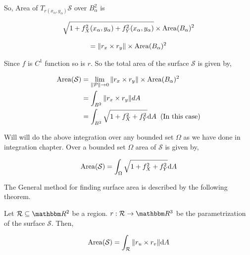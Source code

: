 \documentclass[../Analysis-3]{subfiles}
\begin{document}
So, Area of $T_{r(x_{\alpha},y_{\alpha})} \mathcal{S}$ over $B_{\alpha}^2$ is

$$\sqrt{1 + f_X^2(x_{\alpha},y_{\alpha}) + f_Y^2(x_{\alpha},y_{\alpha})} \times \operatorname{Area}(B_{\alpha})^2$$

$$ = \norm{r_x \times r_y} \times \operatorname{Area}(B_{\alpha})^2$$

\pagebreak

Since $f$ is $C^1$ function so is $r$. So the total area of the surface $\mathcal{S}$ is given by,

\begin{align*}
    \operatorname{Area} (\mathcal{S}) & = \lim_{\norm{\mathcal{P}} \to 0} \norm{r_x \times r_y} \times \operatorname{Area}(B_{\alpha})^2 \\
                        & = \int_{B^2} \norm{r_x \times r_y} dA                                              \\
                        & = \int_{B^2} \sqrt{1 + f_X^2 +f_Y^2} \dd A \hspace{0.2cm}(\text{In this case})
\end{align*}

Will will do the above integration over any bounded set $\Omega$ as we have done in  integration chapter. Over a bounded set $\Omega$ area of $\mathcal{S}$ is given by,

\begin{equation}
    \operatorname{Area} (\mathcal{S}) =  \int_{\Omega} \sqrt{1 + f_X^2 +f_Y^2} \dd A \label{eq:surfa}
\end{equation}

The General method for finding surface area is described by the following theorem.

\begin{Thm}{}{}
    Let $\mathcal{R} \subseteq \R^2$ be a region. $r : \mathcal{R} \to \R^3$ be the parametrization of the surface $\mathcal{S}$. Then,

    \[\operatorname{Area}(\mathcal{S}) = \int_{\mathcal{R}} \norm{r_u \times r_v} \dd A\]
\end{Thm}
\end{document}
